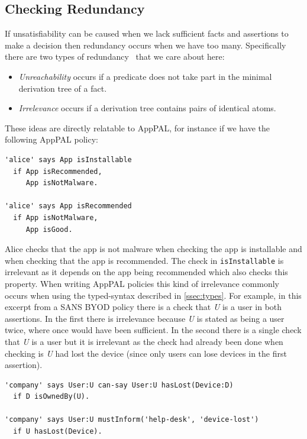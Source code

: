 \documentclass[thesis.tex]{subfiles}
\begin{document}
\subsection{Checking Redundancy}
\label{ssec:redundancy}

If unsatisfiability can be caused when we lack sufficient facts and assertions
to make a decision then redundancy occurs when we have too many. Specifically
there are two types of redundancy~\cite{alon_levy_constraints_1992} that we care
about here:

\begin{itemize}
\item \emph{Unreachability} occurs if a predicate does not take part in the
  minimal derivation tree of a fact.
\item \emph{Irrelevance} occurs if a derivation tree contains pairs of identical atoms.
\end{itemize}

These ideas are directly relatable to AppPAL, for instance if we have the
following AppPAL policy:

\begin{lstlisting}
'alice' says App isInstallable
  if App isRecommended,
     App isNotMalware.

'alice' says App isRecommended
  if App isNotMalware,
     App isGood.
\end{lstlisting}

Alice checks that the app is not malware when checking the app is
installable and when checking that the app is recommended.  The check
in \texttt{isInstallable} is irrelevant as it depends on the app being
recommended which also checks this property.  When writing AppPAL
policies this kind of irrelevance commonly occurs when using the
typed-syntax described in \autoref{ssec:types}. For example, in this
excerpt from a SANS BYOD policy there is a check that \emph{U} is a
user in both assertions.  In the first there is irrelevance because
\emph{U} is stated as being a user twice, where once would have been
sufficient.  In the second there is a single check that \emph{U} is a
user but it is irrelevant as the check had already been done when
checking is \emph{U} had lost the device (since only users can lose
devices in the first assertion).

\begin{lstlisting}
'company' says User:U can-say User:U hasLost(Device:D)
  if D isOwnedBy(U).

'company' says User:U mustInform('help-desk', 'device-lost')
  if U hasLost(Device).
\end{lstlisting}
\end{document}
